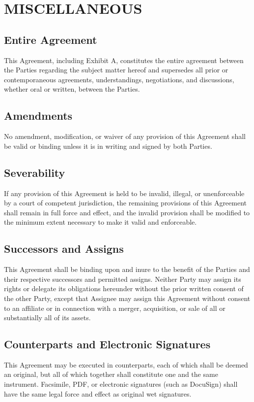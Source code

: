 \section{MISCELLANEOUS}

\subsection{Entire Agreement}
This Agreement, including Exhibit A, constitutes the entire agreement between the Parties regarding the subject matter hereof and supersedes all prior or contemporaneous agreements, understandings, negotiations, and discussions, whether oral or written, between the Parties.

\subsection{Amendments}
No amendment, modification, or waiver of any provision of this Agreement shall be valid or binding unless it is in writing and signed by both Parties.

\subsection{Severability}
If any provision of this Agreement is held to be invalid, illegal, or unenforceable by a court of competent jurisdiction, the remaining provisions of this Agreement shall remain in full force and effect, and the invalid provision shall be modified to the minimum extent necessary to make it valid and enforceable.

\subsection{Successors and Assigns}
This Agreement shall be binding upon and inure to the benefit of the Parties and their respective successors and permitted assigns. Neither Party may assign its rights or delegate its obligations hereunder without the prior written consent of the other Party, except that Assignee may assign this Agreement without consent to an affiliate or in connection with a merger, acquisition, or sale of all or substantially all of its assets.

\subsection{Counterparts and Electronic Signatures}
This Agreement may be executed in counterparts, each of which shall be deemed an original, but all of which together shall constitute one and the same instrument. Facsimile, PDF, or electronic signatures (such as DocuSign) shall have the same legal force and effect as original wet signatures.

